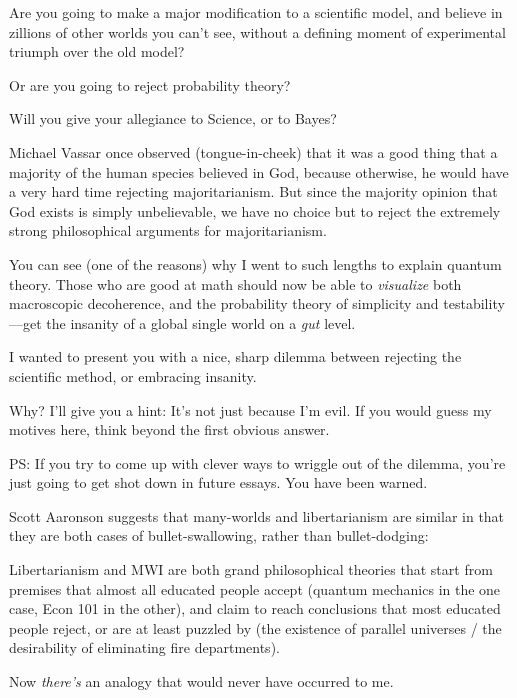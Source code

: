 {
 Are you going to make a major modification to a scientific model,
and believe in zillions of other worlds you can't see,
without a defining moment of experimental triumph over the old model?}

{
 Or are you going to reject probability theory?}

{
 Will you give your allegiance to Science, or to Bayes?}

{
 Michael Vassar once observed (tongue-in-cheek) that it was a good
thing that a majority of the human species believed in God, because
otherwise, he would have a very hard time rejecting majoritarianism.
But since the majority opinion that God exists is simply unbelievable,
we have no choice but to reject the extremely strong philosophical
arguments for majoritarianism.}

{
 You can see (one of the reasons) why I went to such lengths to
explain quantum theory. Those who are good at math should now be able
to \textit{visualize} both macroscopic decoherence, and the probability
theory of simplicity and testability---get the insanity of a global
single world on a \textit{gut} level.}

{
 I wanted to present you with a nice, sharp dilemma between
rejecting the scientific method, or embracing insanity.}

{
 Why? I'll give you a hint: It's
not just because I'm evil. If you would guess my
motives here, think beyond the first obvious answer.}

{
 PS: If you try to come up with clever ways to wriggle out of the
dilemma, you're just going to get shot down in future
essays. You have been warned.}

\myendsectiontext


{
 Scott Aaronson suggests that many-worlds and libertarianism are
similar in that they are both cases of bullet-swallowing, rather than
bullet-dodging:}

{
 Libertarianism and MWI are both grand philosophical theories that
start from premises that almost all educated people accept (quantum
mechanics in the one case, Econ 101 in the other), and claim to reach
conclusions that most educated people reject, or are at least puzzled
by (the existence of parallel universes / the desirability of
eliminating fire departments).}

{
 Now \textit{there's} an analogy that would never
have occurred to me.}


